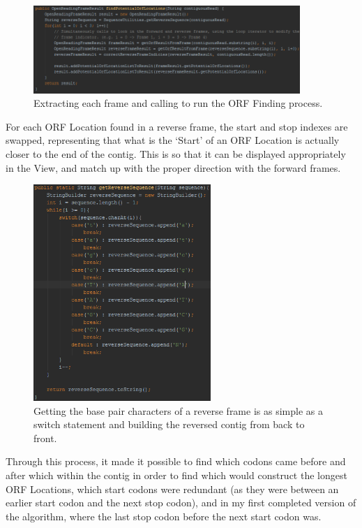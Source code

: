 \begin{figure}[H]
\centering
\includegraphics[width=0.9\textwidth]{images/orffind1}
\caption{Extracting each frame and calling to run the ORF Finding process.}
\end{figure}

For each ORF Location found in a reverse frame, the start and stop indexes are swapped, representing that what is the `Start' of an ORF Location is actually closer to the end of the contig. This is so that it can be displayed appropriately in the View, and match up with the proper direction with the forward frames.

\begin{figure}[H]
\centering
\includegraphics[width=0.6\textwidth]{images/orffind4}
\caption{Getting the base pair characters of a reverse frame is as simple as a switch statement and building the reversed contig from back to front.}
\end{figure}

Through this process, it made it possible to find which codons came before and after which within the contig in order to find which would construct the longest ORF Locations, which start codons were redundant (as they were between an earlier start codon and the next stop codon), and in my first completed version of the algorithm, where the last stop codon before the next start codon was.

